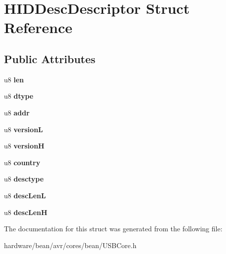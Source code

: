 \hypertarget{struct_h_i_d_desc_descriptor}{}\section{H\+I\+D\+Desc\+Descriptor Struct Reference}
\label{struct_h_i_d_desc_descriptor}
\subsection*{Public Attributes}
\begin{DoxyCompactItemize}
\item 
\hypertarget{struct_h_i_d_desc_descriptor_aebc75efc46076b736c1ea39f35532212}{}u8 {\bfseries len}\label{struct_h_i_d_desc_descriptor_aebc75efc46076b736c1ea39f35532212}

\item 
\hypertarget{struct_h_i_d_desc_descriptor_a343e501ab9f5fdb8f2611a162e7cd5c4}{}u8 {\bfseries dtype}\label{struct_h_i_d_desc_descriptor_a343e501ab9f5fdb8f2611a162e7cd5c4}

\item 
\hypertarget{struct_h_i_d_desc_descriptor_a8a76042b44d23702b25bf1ac8e7ff5ab}{}u8 {\bfseries addr}\label{struct_h_i_d_desc_descriptor_a8a76042b44d23702b25bf1ac8e7ff5ab}

\item 
\hypertarget{struct_h_i_d_desc_descriptor_a37aa9612612dbfd0e3340fc0ad6d59d2}{}u8 {\bfseries version\+L}\label{struct_h_i_d_desc_descriptor_a37aa9612612dbfd0e3340fc0ad6d59d2}

\item 
\hypertarget{struct_h_i_d_desc_descriptor_ae23dba8efd0ec7b1af50eb5bc3fe56d8}{}u8 {\bfseries version\+H}\label{struct_h_i_d_desc_descriptor_ae23dba8efd0ec7b1af50eb5bc3fe56d8}

\item 
\hypertarget{struct_h_i_d_desc_descriptor_aaa543734ffe541f44b00a2c12525b93c}{}u8 {\bfseries country}\label{struct_h_i_d_desc_descriptor_aaa543734ffe541f44b00a2c12525b93c}

\item 
\hypertarget{struct_h_i_d_desc_descriptor_a3cc5a66bf27b2e3a26e7f908b8b8c3c3}{}u8 {\bfseries desctype}\label{struct_h_i_d_desc_descriptor_a3cc5a66bf27b2e3a26e7f908b8b8c3c3}

\item 
\hypertarget{struct_h_i_d_desc_descriptor_a7e534f1ed7baaf7c48400240857ef2c2}{}u8 {\bfseries desc\+Len\+L}\label{struct_h_i_d_desc_descriptor_a7e534f1ed7baaf7c48400240857ef2c2}

\item 
\hypertarget{struct_h_i_d_desc_descriptor_a5ac678caafbf386d8617e93506d5d1e3}{}u8 {\bfseries desc\+Len\+H}\label{struct_h_i_d_desc_descriptor_a5ac678caafbf386d8617e93506d5d1e3}

\end{DoxyCompactItemize}


The documentation for this struct was generated from the following file\+:\begin{DoxyCompactItemize}
\item 
hardware/bean/avr/cores/bean/U\+S\+B\+Core.\+h\end{DoxyCompactItemize}
